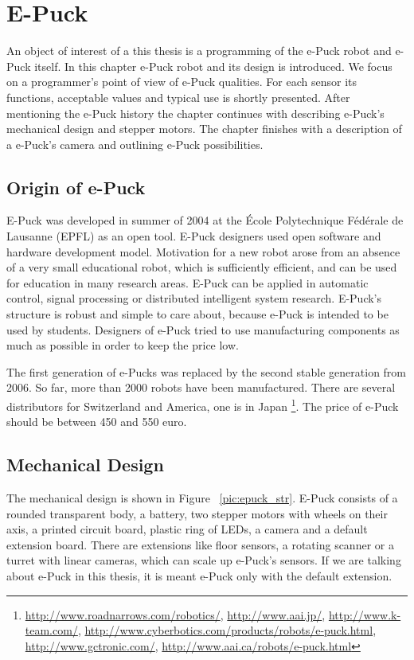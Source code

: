 \documentclass[12pt,notitlepage]{report}
\begin{document}
\chapter{E-Puck}
\label{chap:epuck}
	An object of interest of a this thesis is a programming of the e-Puck robot and e-Puck itself.
	In this chapter e-Puck robot and its design is introduced. We focus on a programmer's point 
	of view of e-Puck qualities.
	For each sensor its functions, acceptable values and typical use is shortly presented. 
	After mentioning the e-Puck history the chapter continues with describing e-Puck's mechanical design and stepper motors. 
	The chapter finishes with a description of a e-Puck's camera and outlining e-Puck possibilities.
\section{Origin of e-Puck}
	E-Puck was developed in summer of 2004 at the École Polytechnique Fédérale de Lausanne (EPFL) 
	as an open tool. E-Puck designers used open software and hardware development model. 
	Motivation for a new robot arose from an absence of a very small educational robot,
	which is sufficiently efficient, and can be used for education in many research areas.
	E-Puck can be applied in automatic control, signal processing or 
	distributed intelligent system research. E-Puck's structure is robust and simple to care about, 
	because e-Puck is intended to be used by students.
	Designers of e-Puck tried to use manufacturing components as much as possible 
	in order to keep the price low.		 
	
	The first generation of e-Pucks was replaced by the second stable generation from 2006.
	So far, more than 2000 robots have been manufactured.
	There are several distributors for Switzerland and America, one is in Japan
	\footnote{\url{http://www.roadnarrows.com/robotics/}, \url{http://www.aai.jp/}, \url{http://www.k-team.com/},
	\url{http://www.cyberbotics.com/products/robots/e-puck.html}, \url{http://www.gctronic.com/},
	\url{http://www.aai.ca/robots/e-puck.html}}.
	The price of e-Puck should be between 450 and 550 euro.%

\section{Mechanical Design}
	The mechanical design  is shown in Figure ~\ref{pic:epuck_str}.
	E-Puck consists of a rounded transparent body, a battery, two stepper motors with
	wheels on their axis, a printed circuit board, plastic ring of LEDs, 
	a camera and a default extension board.
	There are extensions like floor sensors, a rotating scanner or a turret with linear cameras,
	which can scale up e-Puck's sensors. If we are talking about e-Puck in this thesis,
	it is meant e-Puck only with the default extension.
	
\end{document}
